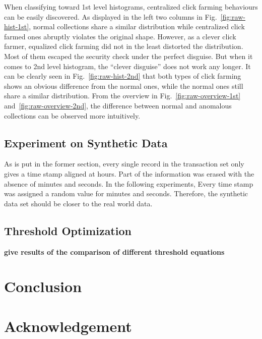 \documentclass[a4paper]{IEEEtran}
\begin{document}
			When classifying toward 1st level histograms, centralized click farming behaviours can be easily discovered. As displayed in the left two columns in Fig.~\ref{fig:raw-hist-1st}, normal collections share a similar distribution while centralized click farmed ones abruptly violates the original shape. However, as a clever click farmer, equalized click farming did not in the least distorted the distribution. Most of them escaped the security check under the perfect disguise.
			But when it comes to 2nd level histogram, the ``clever disguise'' does not work any longer. It can be clearly seen in Fig.~\ref{fig:raw-hist-2nd} that both types of click farming shows an obvious difference from the normal ones, while the normal ones still share a similar distribution.
			From the overview in Fig.~\ref{fig:raw-overview-1st} and~\ref{fig:raw-overview-2nd}, the difference between normal and anomalous collections can be observed more intuitively.
			
		\subsection{Experiment on Synthetic Data}
			As is put in the former section, every single record in the transaction set only gives a time stamp aligned at hours. Part of the information was erased with the absence of minutes and seconds. In the following experiments, Every time stamp was assigned a random value for minutes and seconds. Therefore, the synthetic data set should be closer to the real world data.
			
			
			
		\subsection{Threshold Optimization}
			\textbf{give results of the comparison of different threshold equations}
		
	\section{Conclusion}\label{sec:conclusion}
	
	\section*{Acknowledgement}
		
	\printbibliography
\end{document}
